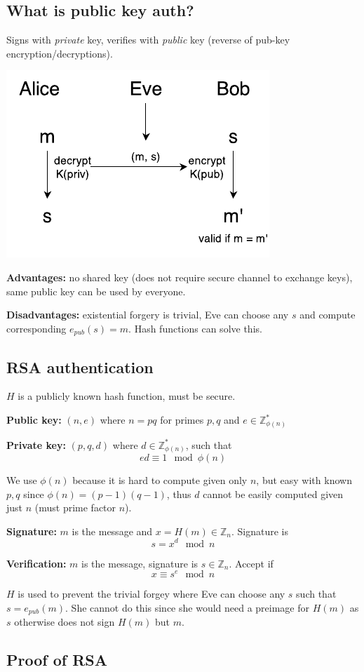 \subsection{What is public key auth?}
Signs with \emph{private} key, verifies with \emph{public} key (reverse of pub-key encryption/decryptions).

\begin{center}
\includegraphics{images/2-pub-AB.pdf}
\end{center}

\textbf{Advantages:} no shared key (does not require secure channel to exchange keys), same public key can be used by everyone.

\textbf{Disadvantages:} existential forgery is trivial, Eve can choose any $s$ and compute corresponding $e_{pub}(s) = m$. Hash functions can solve this.

\subsection{RSA authentication}
$H$ is a publicly known hash function, must be secure.

\textbf{Public key:} $(n, e)$ where $n = pq$ for primes $p, q$ and $e \in \mathbb{Z}_{\phi(n)}^*$

\textbf{Private key:} $(p, q, d)$ where $d \in \mathbb{Z}_{\phi(n)}^*$, such that
\[ ed \equiv 1 \mod \phi(n) \]

We use $\phi(n)$ because it is hard to compute given only $n$, but easy with known $p, q$ since $\phi(n) = (p-1)(q-1)$, thus $d$ cannot be easily computed given just $n$ (must prime factor $n$).

\textbf{Signature:} $m$ is the message and $x = H(m) \in \mathbb{Z}_n$. Signature is
\[ s = x^d \mod n \]

\textbf{Verification:} $m$ is the message, signature is $s \in \mathbb{Z}_n$. Accept if
\[ x \equiv s^e \mod n \]

$H$ is used to prevent the trivial forgey where Eve can choose any $s$ such that $s = e_{pub}(m)$. She cannot do this since she would need a preimage for $H(m)$ as $s$ otherwise does not sign $H(m)$ but $m$.

\subsection{Proof of RSA}
